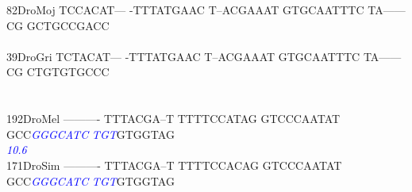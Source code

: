 \documentclass[11pt,twoside,reqno,a4paper]{article}
\begin{document}
{82\hspace*{2\charwidth}DroMoj	TCCACAT---	-TTTATGAAC	T--ACGAAAT	GTGCAATTTC	TA------CG	GCTGCCGACC	\\
\hspace*{4\charwidth}\hspace*{7\charwidth}\hspace*{1\charwidth}\hspace*{1\charwidth}\hspace*{1\charwidth}\hspace*{1\charwidth}\hspace*{1\charwidth}\hspace*{1\charwidth}\\
39\hspace*{2\charwidth}DroGri	TCTACAT---	-TTTATGAAC	T--ACGAAAT	GTGCAATTTC	TA------CG	CTGTGTGCCC	\\
\hspace*{4\charwidth}\hspace*{7\charwidth}\hspace*{1\charwidth}\hspace*{1\charwidth}\hspace*{1\charwidth}\hspace*{1\charwidth}\hspace*{1\charwidth}\hspace*{1\charwidth}\\
\\
192\hspace*{1\charwidth}DroMel	----------	TTTACGA--T	TTTTCCATAG	GTCCCAATAT	GCC\textit{\textcolor{blue}{G}}\textit{\textcolor{blue}{G}}\textit{\textcolor{blue}{G}}\textit{\textcolor{blue}{C}}\textit{\textcolor{blue}{A}}\textit{\textcolor{blue}{T}}\textit{\textcolor{blue}{C}}	\textit{\textcolor{blue}{T}}\textit{\textcolor{blue}{G}}\textit{\textcolor{blue}{T}}GTGGTAG	\\
\hspace*{4\charwidth}\hspace*{7\charwidth}\hspace*{1\charwidth}\hspace*{1\charwidth}\hspace*{1\charwidth}\hspace*{1\charwidth}\hspace*{43\charwidth}\textit{\textcolor{blue}{10.6}}\hspace*{1\charwidth}\hspace*{1\charwidth}\\
171\hspace*{1\charwidth}DroSim	----------	TTTACGA--T	TTTTCCACAG	GTCCCAATAT	GCC\textit{\textcolor{blue}{G}}\textit{\textcolor{blue}{G}}\textit{\textcolor{blue}{G}}\textit{\textcolor{blue}{C}}\textit{\textcolor{blue}{A}}\textit{\textcolor{blue}{T}}\textit{\textcolor{blue}{C}}	\textit{\textcolor{blue}{T}}\textit{\textcolor{blue}{G}}\textit{\textcolor{blue}{T}}GTGGTAG	\\
}
\end{document}
